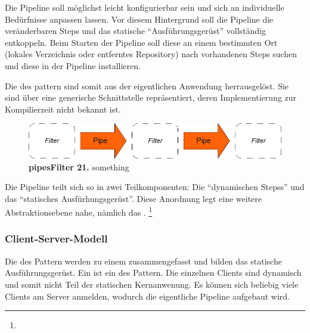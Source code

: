 Die Pipeline soll möglichst leicht konfigurierbar sein und sich an
individuelle Bedürfnisse anpassen lassen.
Vor diesem Hintergrund soll die Pipeline die veränderbaren Steps und das
statische \enquote{Ausführungsgerüst} vollständig entkoppeln. Beim Starten der
Pipeline soll diese an einem bestimmten Ort (lokales Verzeichnis oder
entferntes Repository) nach vorhandenen Steps suchen und diese in der Pipeline
installieren.

Die  des  pattern sind somit aus der
eigentlichen Anwendung herrausgelöst. Sie sind über eine generische
Schnittstelle repräsentiert, deren Implementierung zur Kompilierzeit nicht
bekannt ist.

\begin{figure}[htbp]
	\begin{center}
		\includegraphics[scale=0.7]{pics/pipesFilter21.png}
	\caption[Pipes and Filter 21]{
	\textbf{pipesFilter 21.}
	something}
	\end{center}
	\label{fig:pipesFilter21}
\end{figure}

Die Pipeline teilt sich so in zwei Teilkomponenten:
Die \enquote{dynamischen Stepss} und das \enquote{statisches Ausfürhungsgerüst}.
Diese Anordnung legt eine weitere Abstraktionsebene nahe, nämlich das
.
\footnote{}

\subsubsection{Client-Server-Modell}
Die  des  Pattern werden zu einem
 zusammengefasst und bilden das {statische Ausführungsgerüst}.
Ein  ist ein  des  Pattern.
Die einzelnen Clients sind dynamisch und somit nicht Teil der
statischen Kernanwenung.
Es können sich beliebig viele Clients am Server anmelden, wodurch die
eigentliche Pipeline aufgebaut wird.

